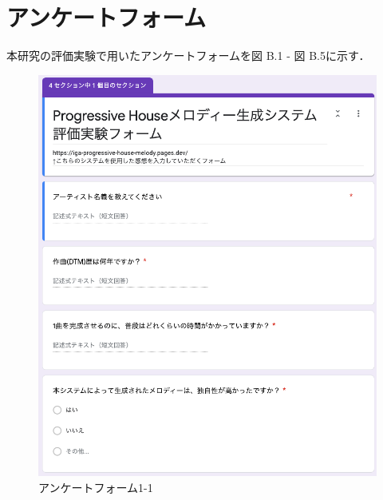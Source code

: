 \chapter{アンケートフォーム}
本研究の評価実験で用いたアンケートフォームを図 B.1 - 図 B.5に示す．

\begin{figure}[htbp]
	\begin{center}
		\includegraphics[width=14.5cm]{image/forms/form1.png}
		\caption{アンケートフォーム1-1}
	\end{center}
\end{figure}


